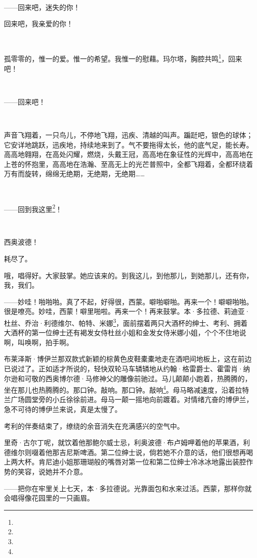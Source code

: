 \par  
\par ——回来吧，迷失的你！
\par 回来吧，我亲爱的你！
\par  
\par 孤零零的，惟一的爱。惟一的希望。我惟一的慰藉。玛尔塔，胸腔共鸣\footnote{}，回来吧！
\par  
\par ——回来吧！
\par  
\par 声音飞翔着，一只鸟儿，不停地飞翔，迅疾、清越的叫声。蹁跹吧，银色的球体；它安详地跳跃，迅疾地，持续地来到了。气不要拖得太长，他的底气足，能长寿。高高地翱翔，在高处闪耀，燃烧，头戴王冠，高高地在象征性的光辉中，高高地在上苍的怀抱里，高高地在浩瀚、至高无上的光芒普照中，全都飞翔着，全都环绕着万有而旋转，绵绵无绝期，无绝期，无绝期……
\par  
\par ——回到我这里\footnote{}！
\par  
\par 西奥波德！
\par 耗尽了。
\par 哦，唱得好。大家鼓掌。她应该来的。到我这儿，到他那儿，到她那儿，还有你，我，我们。
\par ——妙哇！啪啪啪。真了不起，好得很，西蒙。噼啪噼啪。再来一个！噼噼啪啪。很是嘹亮。妙哇，西蒙！噼里啪啦。再来一个！再来鼓掌。本·多拉德、莉迪亚·杜丝、乔治·利德维尔、帕特、米娜\footnote{}，面前摆着两只大酒杯的绅士、考利、拥着大酒杯的第一位绅士还有褐发女侍杜丝小姐和金发女侍米娜小姐，个个不住地说啊，叫唤啊，拍手啊。
\par 布莱泽斯·博伊兰那双款式新颖的棕黄色皮鞋橐橐地走在酒吧间地板上，这在前边已说过了。正如适才所说的，轻快双轮马车辚辚地从约翰·格雷爵士、霍雷肖·纳尔逊和可敬的西奥博尔德·马修神父的雕像前驰过。马儿颠颠小跑着，热腾腾的，坐在那儿也热腾腾的。那口钟。敲响。那口钟。敲响\footnote{}。母马略减速度，沿着拉特兰广场圆堂旁的小丘徐徐前进。母马一颠一摇地向前踱着。对情绪亢奋的博伊兰，急不可待的博伊兰来说，真是太慢了。
\par 考利的伴奏结束了，缭绕的余音消失在充满感兴的空气中。
\par 里奇·古尔丁呢，就饮着他那鲍尔威士忌，利奥波德·布卢姆呷着他的苹果酒，利德维尔则啜着他那吉尼斯啤酒。第二位绅士说，倘若她不介意的话，他们很想再喝上两大杯。肯尼迪小姐那珊瑚般的嘴唇对第一位和第二位绅士冷冰冰地露出装腔作势的笑容，说她并不介意。
\par ——把你在牢里关上七天，本·多拉德说。光靠面包和水来过活。西蒙，那样你就会唱得像花园里的一只画眉。
